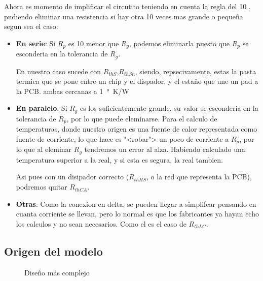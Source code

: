 Ahora es momento de implificar el circutito teniendo en cuenta la regla del 10
. pudiendo eliminar una resistencia
si hay otra 10 veces mas grande o pequeña segun sea el caso:
\begin{itemize}
    \item \textbf{En serie}: Si $R_p$ es 10 menor que $R_g$, podemos eliminarla puesto que 
    $R_p$ se esconderia en la tolerancia de $R_g$.

    En nuestro caso sucede con $R_{thS}$,$R_{thSn}$, siendo, repsecivamente, estas la pasta
    termica que se pone entre un chip y el dispador, y el estaño que une un pad a la PCB.
    ambas cercanas a \SI{1}{\degree\kelvin/\watt}
    \item \textbf{En paralelo}: Si $R_g$ es los suficientemente grande, su valor se esconderia
    en la tolerancia de $R_p$, por lo que puede eleminarse. Para el calculo de temperaturas, donde nuestro
    origen es una fuente de calor representada como fuente de corriente, lo que hace es "<robar">
    un poco de corriente a $R_p$, por lo que al eleminar $R_g$ tendremos un error al alza. 
    Habiendo calculado una temperatura superior a la real, y si esta es segura, la real tambien.
    
    Asi pues con un disipador correcto ($R_{thHS}$, o la red que representa la PCB), podremos quitar
    $R_{thCA}$.
    \item \textbf{Otras}: Como la conexion en delta, se pueden llegar a simplifcar
    pensando en cuanta corriente se llevan, pero lo normal es que los fabricantes ya
    hayan echo los calculos y no sean necesarios. Como el es el caso de $R_{thLC}$.    
\end{itemize}

\subsection{Origen del modelo}

\begin{figure}[H]
    \centering
    
    \caption{Diseño más complejo}
    \label{fig:ThermalModelOrigin}
\end{figure}
